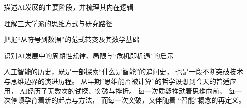 
\begin{introduction}
  \item 描述AI发展的主要阶段，并梳理其内在逻辑
  \item 理解三大学派的思维方式与研究路径
  \item 把握“从符号到数据”的范式转变及其数学基础
  \item 识别AI发展中的周期性规律、局限与“危机即机遇”的启示
\end{introduction}





 

人工智能的历史，既是一部探索“什么是智能”的追问史，
也是一段不断突破技术与思维边界的演进历程。
从早期“思维能否被计算”的哲学设想到今天的普适应用，
AI经历了无数次的试探、突破与挫折。  
每一次质疑推动着思维向前，
每一次停顿孕育着新的起点与方法，
而每一次突破，又伴随着 “智能”概念的再定义。


